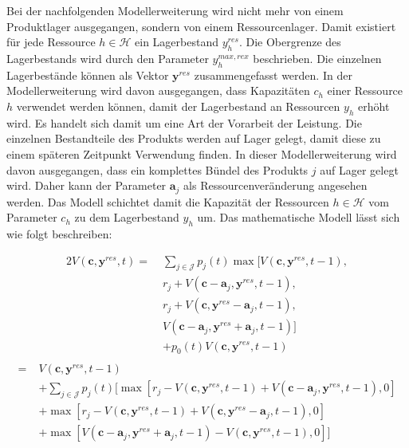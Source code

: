 Bei der nachfolgenden Modellerweiterung wird nicht mehr von einem Produktlager ausgegangen, sondern von einem Ressourcenlager. Damit existiert für jede Ressource $h\in\mathcal{H}$ ein Lagerbestand $y_h^{res}$. Die Obergrenze des Lagerbestands wird durch den Parameter $y_{h}^{max,rex}$ beschrieben. Die einzelnen Lagerbestände können als Vektor $\textbf{y}^{res}$ zusammengefasst werden. In der Modellerweiterung wird davon ausgegangen, dass Kapazitäten $c_{h}$ einer Ressource $h$ verwendet werden können, damit der Lagerbestand an Ressourcen $y_{h}$ erhöht wird. Es handelt sich damit um eine Art der Vorarbeit der Leistung. Die einzelnen Bestandteile des Produkts werden auf Lager gelegt, damit diese zu einem späteren Zeitpunkt Verwendung finden. In dieser Modellerweiterung wird davon ausgegangen, dass ein komplettes Bündel des Produkts $j$ auf Lager gelegt wird. Daher kann der Parameter $\textbf{a}_{j}$ als Ressourcenveränderung angesehen werden. Das Modell schichtet damit die Kapazität der Ressourcen $h\in\mathcal{H}$ vom Parameter $c_{h}$ zu dem Lagerbestand $y_{h}$ um. Das mathematische Modell lässt sich wie folgt beschreiben:

\begin{alignat*}{2}
V(\textbf{c}, \textbf{y}^{res}, t) =\;& \sum_{j \in \mathcal{J}}p_{j}(t)\max[V(\textbf{c}, \textbf{y}^{res}, t-1),\\
&r_{j} + V(\textbf{c}-\textbf{a}_j, \textbf{y}^{res}, t-1),\\
&r_{j} + V(\textbf{c}, \textbf{y}^{res}-\textbf{a}_j, t-1),\\
&V(\textbf{c}-\textbf{a}_j, \textbf{y}^{res}+\textbf{a}_j, t-1)]\\
&+ p_{0}(t)V(\textbf{c}, \textbf{y}^{res}, t-1) \\
\end{alignat*}
\begin{equation}\label{workup}
\begin{alignat*}{2}
= \;& V(\textbf{c}, \textbf{y}^{res}, t-1)\\
&+ \sum_{j \in \mathcal{J}}p_{j}(t)[\max[r_{j} - V(\textbf{c}, \textbf{y}^{res}, t-1) + V(\textbf{c}-\textbf{a}_j, \textbf{y}^{res}, t-1),0] \\
&+ \max[r_{j} - V(\textbf{c}, \textbf{y}^{res}, t-1) + V(\textbf{c}, \textbf{y}^{res}-\textbf{a}_j, t-1),0]\\
&+ \max[V(\textbf{c}-\textbf{a}_j, \textbf{y}^{res}+\textbf{a}_j, t-1) - V(\textbf{c}, \textbf{y}^{res}, t-1) ,0]]\\
\end{alignat*}
\end{equation}

